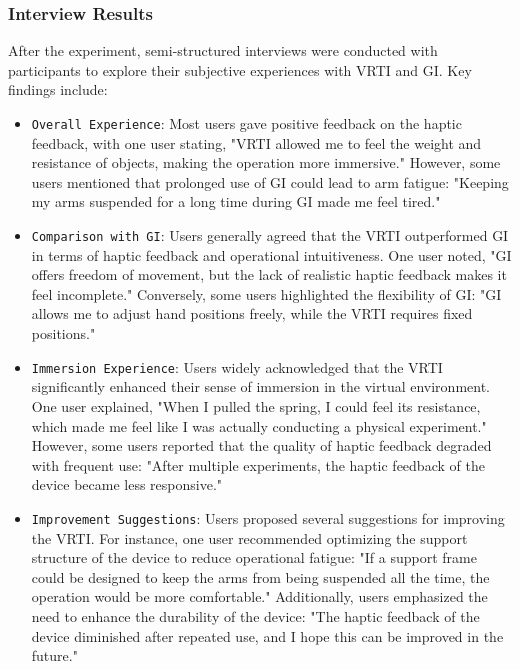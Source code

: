 \documentclass[sigconf,review,anonymous]{acmart}
\begin{document}
\subsubsection{Interview Results}
After the experiment, semi-structured interviews were conducted with participants to explore their subjective experiences with VRTI and GI. Key findings include:

\begin{itemize}
  \item {\texttt{Overall Experience}}: Most users gave positive feedback on the haptic feedback, with one user stating, "VRTI allowed me to feel the weight and resistance of objects, making the operation more immersive." However, some users mentioned that prolonged use of GI could lead to arm fatigue: "Keeping my arms suspended for a long time during GI made me feel tired."

  \item {\texttt{Comparison with GI}}: Users generally agreed that the VRTI outperformed GI in terms of haptic feedback and operational intuitiveness. One user noted, "GI offers freedom of movement, but the lack of realistic haptic feedback makes it feel incomplete." Conversely, some users highlighted the flexibility of GI: "GI allows me to adjust hand positions freely, while the VRTI requires fixed positions."

  \item {\texttt{Immersion Experience}}: Users widely acknowledged that the VRTI significantly enhanced their sense of immersion in the virtual environment. One user explained, "When I pulled the spring, I could feel its resistance, which made me feel like I was actually conducting a physical experiment." However, some users reported that the quality of haptic feedback degraded with frequent use: "After multiple experiments, the haptic feedback of the device became less responsive."

  \item {\texttt{Improvement Suggestions}}: Users proposed several suggestions for improving the VRTI. For instance, one user recommended optimizing the support structure of the device to reduce operational fatigue: "If a support frame could be designed to keep the arms from being suspended all the time, the operation would be more comfortable." Additionally, users emphasized the need to enhance the durability of the device: "The haptic feedback of the device diminished after repeated use, and I hope this can be improved in the future."
\end{itemize}
\end{document}
